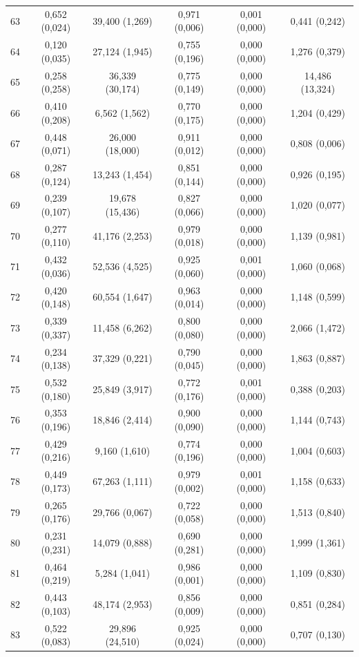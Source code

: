 \begin{tabular}{l c c c c c}
63 & 0,652 (0,024) & 39,400 (1,269) & 0,971 (0,006) & 0,001 (0,000) & 0,441 (0,242) \\
64 & 0,120 (0,035) & 27,124 (1,945) & 0,755 (0,196) & 0,000 (0,000) & 1,276 (0,379) \\
65 & 0,258 (0,258) & 36,339 (30,174) & 0,775 (0,149) & 0,000 (0,000) & 14,486 (13,324) \\
66 & 0,410 (0,208) & 6,562 (1,562) & 0,770 (0,175) & 0,000 (0,000) & 1,204 (0,429) \\
67 & 0,448 (0,071) & 26,000 (18,000) & 0,911 (0,012) & 0,000 (0,000) & 0,808 (0,006) \\
68 & 0,287 (0,124) & 13,243 (1,454) & 0,851 (0,144) & 0,000 (0,000) & 0,926 (0,195) \\
69 & 0,239 (0,107) & 19,678 (15,436) & 0,827 (0,066) & 0,000 (0,000) & 1,020 (0,077) \\
70 & 0,277 (0,110) & 41,176 (2,253) & 0,979 (0,018) & 0,000 (0,000) & 1,139 (0,981) \\
71 & 0,432 (0,036) & 52,536 (4,525) & 0,925 (0,060) & 0,001 (0,000) & 1,060 (0,068) \\
72 & 0,420 (0,148) & 60,554 (1,647) & 0,963 (0,014) & 0,000 (0,000) & 1,148 (0,599) \\
73 & 0,339 (0,337) & 11,458 (6,262) & 0,800 (0,080) & 0,000 (0,000) & 2,066 (1,472) \\
74 & 0,234 (0,138) & 37,329 (0,221) & 0,790 (0,045) & 0,000 (0,000) & 1,863 (0,887) \\
75 & 0,532 (0,180) & 25,849 (3,917) & 0,772 (0,176) & 0,001 (0,000) & 0,388 (0,203) \\
76 & 0,353 (0,196) & 18,846 (2,414) & 0,900 (0,090) & 0,000 (0,000) & 1,144 (0,743) \\
77 & 0,429 (0,216) & 9,160 (1,610) & 0,774 (0,196) & 0,000 (0,000) & 1,004 (0,603) \\
78 & 0,449 (0,173) & 67,263 (1,111) & 0,979 (0,002) & 0,001 (0,000) & 1,158 (0,633) \\
79 & 0,265 (0,176) & 29,766 (0,067) & 0,722 (0,058) & 0,000 (0,000) & 1,513 (0,840) \\
80 & 0,231 (0,231) & 14,079 (0,888) & 0,690 (0,281) & 0,000 (0,000) & 1,999 (1,361) \\
81 & 0,464 (0,219) & 5,284 (1,041) & 0,986 (0,001) & 0,000 (0,000) & 1,109 (0,830) \\
82 & 0,443 (0,103) & 48,174 (2,953) & 0,856 (0,009) & 0,000 (0,000) & 0,851 (0,284) \\
83 & 0,522 (0,083) & 29,896 (24,510) & 0,925 (0,024) & 0,000 (0,000) & 0,707 (0,130) \\

\end{tabular}
